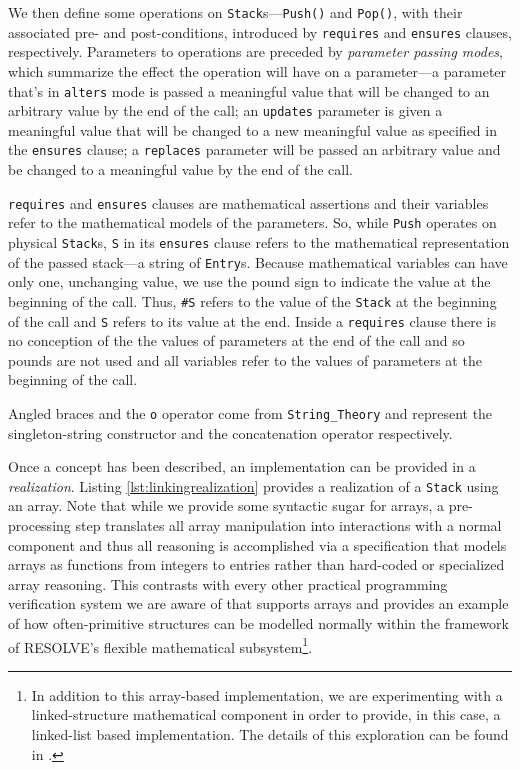 We then define some operations on \texttt{Stack}s---\texttt{Push()} and \texttt{Pop()}, with their associated pre- and post-conditions, introduced by \texttt{requires} and \texttt{ensures} clauses, respectively.  Parameters to operations are preceded by \emph{parameter passing modes}, which summarize the effect the operation will have on a parameter---a parameter that's in \texttt{alters} mode is passed a meaningful value that will be changed to an arbitrary value by the end of the call; an \texttt{updates} parameter is given a meaningful value that will be changed to a new meaningful value as specified in the \texttt{ensures} clause;  a \texttt{replaces} parameter will be passed an arbitrary value and be changed to a meaningful value by the end of the call.

\texttt{requires} and \texttt{ensures} clauses are mathematical assertions and their variables refer to the mathematical models of the parameters.  So, while \texttt{Push} operates on physical \texttt{Stack}s, \texttt{S} in its \texttt{ensures} clause refers to the mathematical representation of the passed stack---a string of \texttt{Entry}s.  Because mathematical variables can have only one, unchanging value, we use the pound sign to indicate the value at the beginning of the call.  Thus, \texttt{\#S} refers to the value of the \texttt{Stack} at the beginning of the call and \texttt{S} refers to its value at the end.  Inside a \texttt{requires} clause there is no conception of the the values of parameters at the end of the call and so pounds are not used and all variables refer to the values of parameters at the beginning of the call.

Angled braces and the \texttt{o} operator come from \texttt{String\_Theory} and represent the singleton-string constructor and the concatenation operator respectively.

Once a concept has been described, an implementation can be provided in a \emph{realization}.  Listing \ref{lst:linkingrealization} provides a realization of a \texttt{Stack} using an array.  Note that while we provide some syntactic sugar for arrays, a pre-processing step translates all array manipulation into interactions with a normal component and thus all reasoning is accomplished via a specification that models arrays as functions from integers to entries rather than hard-coded or specialized array reasoning.  This contrasts with every other practical programming verification system we are aware of that supports arrays and provides an example of how often-primitive structures can be modelled normally within the framework of RESOLVE's flexible mathematical subsystem\footnote{In addition to this array-based implementation, we are experimenting with a linked-structure mathematical component in order to provide, in this case, a linked-list based implementation.  The details of this exploration can be found in \cite{kulczyckiPointers}.}.

